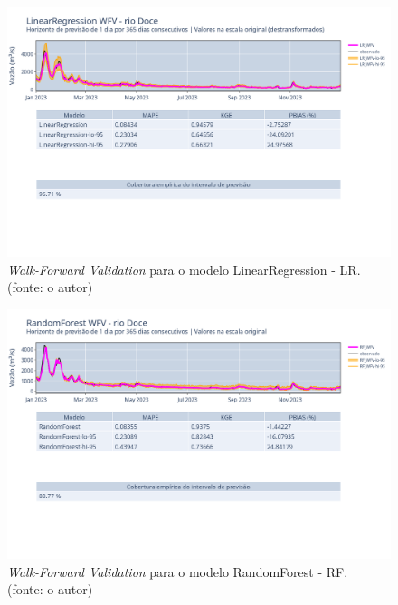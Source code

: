 \begin{figure}[!h]
	\centering
	\includegraphics[scale=0.33]{Figuras/rio_doce/wfv/LR/LR_WFV_LOG.png}
	\caption{\textit{Walk-Forward Validation} para o modelo LinearRegression - LR.\\(fonte: o autor)}
	\label{fig:doce_LR_WFV_LOG}
\end{figure}

\begin{figure}[!h]
	\centering
	\includegraphics[scale=0.33]{Figuras/rio_doce/wfv/RF/RF_WFV_ORIG.png}
	\caption{\textit{Walk-Forward Validation} para o modelo RandomForest - RF.\\(fonte: o autor)}
	\label{fig:doce_RF_WFV_ORIG}
\end{figure}
\clearpage

%

